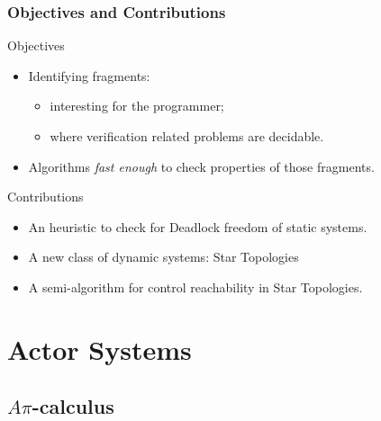 \documentclass{beamer}
\theoremstyle{remark}
\theoremstyle{definition}
\newcommand{\scala}{\textsc{Scala}}
\newcommand{\api}{$A\pi$-calculus}
\begin{document}
\begin{frame}[label=objectives]
\frametitle{Objectives and Contributions}

\begin{block}{Objectives}
\begin{itemize}
\item Identifying fragments:
\begin{itemize}
\item interesting for the programmer;
\item where verification related problems are decidable.
\end{itemize}
\item Algorithms \emph{fast enough} to check properties of those fragments.
\end{itemize}
\end{block}

\begin{block}{Contributions}
\begin{itemize}
\item An heuristic to check for Deadlock freedom of static systems.
\item A new class of dynamic systems: \alert{Star Topologies}
\item A semi-algorithm for control reachability in Star Topologies.
\end{itemize}
\end{block}

\end{frame}
\section{Actor Systems}


\subsection{\api{}}
\end{document}
